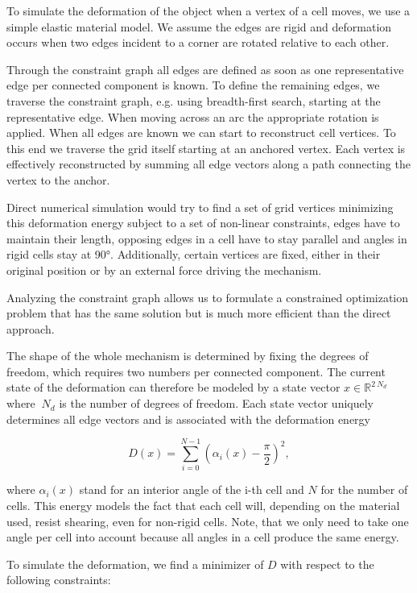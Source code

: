 To simulate the deformation of the object when a vertex of a cell moves, we use a simple elastic material model. We assume the edges are rigid and deformation occurs when two edges incident to a corner are rotated relative to each other. 

Through the constraint graph all edges are defined as soon as one representative edge per connected component is known. To define the remaining edges, we traverse the constraint graph, e.g. using breadth-first search, starting at the representative edge. When moving across an arc the appropriate rotation is applied. When all edges are known we can start to reconstruct cell vertices. To this end we traverse the grid itself starting at an anchored vertex. Each vertex is effectively reconstructed by summing all edge vectors along a path connecting the vertex to the anchor. 

Direct numerical simulation would try to find a set of grid vertices minimizing this deformation energy subject to a set of non-linear constraints, edges have to maintain their length, opposing edges in a cell have to stay parallel and angles in rigid cells stay at 90°. Additionally, certain vertices are fixed, either in their original position or by an external force driving the mechanism. 

Analyzing the constraint graph allows us to formulate a constrained optimization problem that has the same solution but is much more efficient than the direct approach.

The shape of the whole mechanism is determined by fixing the degrees of freedom, which requires two numbers per connected component. The current state of the deformation can therefore be modeled by a state vector $x\in\mathbb{R}^{2\ N_d}$ where $\ N_d$ is the number of degrees of freedom. Each state vector uniquely determines all edge vectors and is associated with the deformation energy

$$ D\left(x\right)=\sum_{i=0}^{N-1}\left(\alpha_i\left(x\right)-\frac{\pi}{2}\right)^2,$$

where $\alpha_i(x)$ stand for an interior angle of the i-th cell and $N$ for the number of cells. This energy models the fact that each cell will, depending on the material used, resist shearing, even for non-rigid cells. Note, that we only need to take one angle per cell into account because all angles in a cell produce the same energy. 

To simulate the deformation, we find a minimizer of $D$ with respect to the following constraints:

